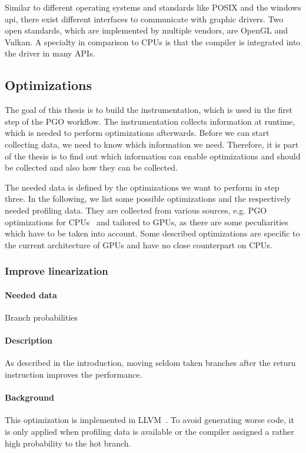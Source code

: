Similar to different operating systems and standards like POSIX and the windows \gls{api}, there exist different interfaces to communicate with graphic drivers. Two open standards, which are implemented by multiple vendors, are OpenGL and Vulkan. A specialty in comparison to CPUs is that the compiler is integrated into the driver in many APIs.


\subsection{Optimizations}
The goal of this thesis is to build the instrumentation, which is used in the first step of the PGO workflow. The instrumentation collects information at runtime, which is needed to perform optimizations afterwards. Before we can start collecting data, we need to know which information we need. Therefore, it is part of the thesis is to find out which information can enable optimizations and should be collected and also how they can be collected.

The needed data is defined by the optimizations we want to perform in step three. In the following, we list some possible optimizations and the respectively needed profiling data. They are collected from various sources, e.g. PGO optimizations for CPUs~\cite{MicrosoftPgo} and tailored to GPUs, as there are some peculiarities which have to be taken into account. Some described optimizations are specific to the current architecture of GPUs and have no close counterpart on CPUs.

\subsubsection{Improve linearization}
\paragraph{Needed data} Branch probabilities
\paragraph{Description} As described in the introduction, moving seldom taken branches after the return instruction improves the performance.
\paragraph{Background} This optimization is implemented in LLVM~\cite{llvmLinearization}. To avoid generating worse code, it is only applied when profiling data is available or the compiler assigned a rather high probability to the hot branch.

